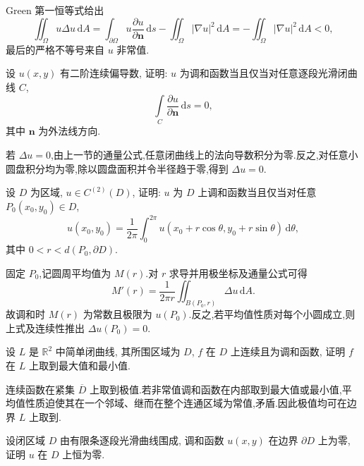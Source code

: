 \begin{solution}
    Green 第一恒等式给出
    \[
        \iint_\Omega u\Delta u\,\mathrm{d}A
        =\int_{\partial\Omega}u\dfrac{\partial u}{\partial\bm n}\,\mathrm{d}s
        -\iint_\Omega|\nabla u|^2\,\mathrm{d}A
        =-\iint_\Omega|\nabla u|^2\,\mathrm{d}A<0,
    \]
    最后的严格不等号来自 $u$ 非常值.
\end{solution}

\begin{example}
    设 $u(x,y)$ 有二阶连续偏导数, 证明: $u$ 为调和函数当且仅当对任意逐段光滑闭曲线 $C$,
    \[
        \int\limits_C\dfrac{\partial u}{\partial\bm n}\,\mathrm{d}s=0,
    \]
    其中 $\bm n$ 为外法线方向.
\end{example}
\exampleblank

\begin{solution}
    若 $\Delta u=0$,由上一节的通量公式,任意闭曲线上的法向导数积分为零.反之,对任意小圆盘积分均为零,除以圆盘面积并令半径趋于零,得到 $\Delta u=0$.
\end{solution}

\begin{example}
    设 $D$ 为区域, $u\in C^{(2)}(D)$, 证明: $u$ 为 $D$ 上调和函数当且仅当对任意 $P_0(x_0,y_0)\in D$,
    \[
        u(x_0,y_0)=\dfrac{1}{2\pi}\int_0^{2\pi}u(x_0+r\cos\theta,y_0+r\sin\theta)\,\mathrm{d}\theta,
    \]
    其中 $0<r<d(P_0,\partial D)$.
\end{example}
\exampleblank

\begin{solution}
    固定 $P_0$,记圆周平均值为 $M(r)$.对 $r$ 求导并用极坐标及通量公式可得
    \[
        M'(r)=\dfrac{1}{2\pi r}\iint_{B(P_0,r)}\Delta u\,\mathrm{d}A.
    \]
    故调和时 $M(r)$ 为常数且极限为 $u(P_0)$.反之,若平均值性质对每个小圆成立,则上式及连续性推出 $\Delta u(P_0)=0$.
\end{solution}

\begin{example}
    设 $L$ 是 $\mathbb{R}^2$ 中简单闭曲线, 其所围区域为 $D$, $f$ 在 $D$ 上连续且为调和函数, 证明 $f$ 在 $L$ 上取到最大值和最小值.
\end{example}
\exampleblank

\begin{solution}
    连续函数在紧集 $\overline D$ 上取到极值.若非常值调和函数在内部取到最大值或最小值,平均值性质迫使其在一个邻域、继而在整个连通区域为常值,矛盾.因此极值均可在边界 $L$ 上取到.
\end{solution}

\begin{example}
    设闭区域 $D$ 由有限条逐段光滑曲线围成, 调和函数 $u(x,y)$ 在边界 $\partial D$ 上为零, 证明 $u$ 在 $D$ 上恒为零.
\end{example}
\exampleblank

